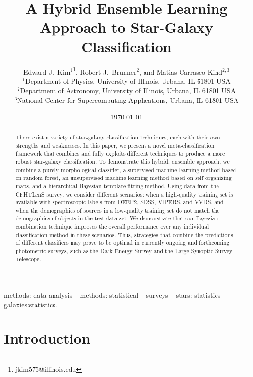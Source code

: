 \documentclass[useAMS,usenatbib]{mn2e}
\title{A Hybrid Ensemble Learning Approach to Star-Galaxy Classification}
\author[E. J. Kim, R. J. Brunner \& M. Carrasco Kind]{
  Edward J.~Kim$^1$\thanks{jkim575@illinois.edu}, Robert J.~Brunner$^2$,
  and Matias Carrasco Kind$^{2,3}$\\
$^1$Department of Physics, University of Illinois, Urbana, IL 61801 USA\\
$^2$Department of Astronomy, University of Illinois, Urbana, IL 61801 USA\\
$^3$National Center for Supercomputing Applications, Urbana, IL 61801 USA}
\begin{document}
\date{\today}

\pagerange{\pageref{firstpage}--\pageref{lastpage}} 

\maketitle

\label{firstpage}
\begin{abstract}
There exist a variety of star-galaxy classification techniques,
each with their own strengths and weaknesses.
In this paper, we present a novel meta-classification
framework that combines and fully exploits different techniques
to produce a more robust star-galaxy classification.
To demonstrate this hybrid, ensemble approach,
we combine a purely morphological classifier,
a supervised machine learning method based on random forest,
an unsupervised machine learning method based on self-organizing maps,
and a hierarchical Bayesian template fitting method.
Using data from the CFHTLenS survey,
we consider different scenarios:
when a high-quality training set is available with spectroscopic labels from
DEEP2, SDSS, VIPERS, and VVDS, and
when the demographics of sources in a low-quality training set
do not match the demographics of objects in the test data set.
We demonstrate that our Bayesian combination technique improves
the overall performance over any individual classification method
in these scenarios.
Thus, strategies that combine the predictions of different classifiers
may prove to be optimal in currently ongoing and forthcoming
photometric surveys,
such as the Dark Energy Survey and the Large Synoptic Survey Telescope.

\end{abstract}

\begin{keywords}
methods: data analysis -- methods: statistical -- surveys -- stars: statistics
-- galaxies:statistics.
\end{keywords}


\section{Introduction}
  \label{section:introduction}
\end{document}
